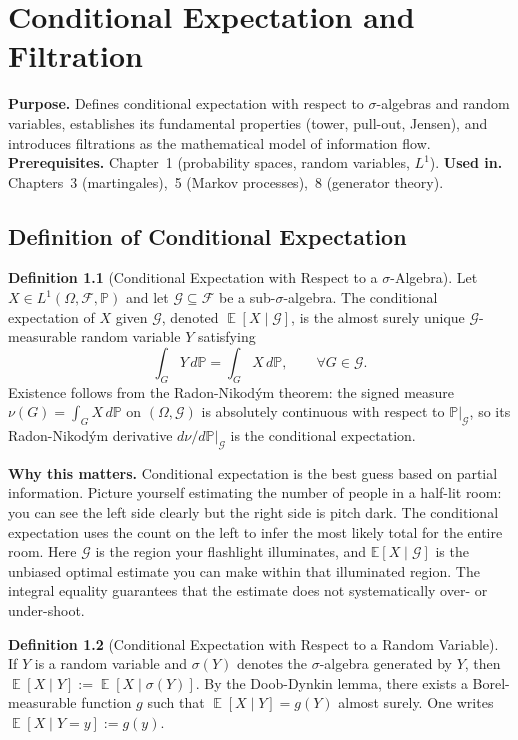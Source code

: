 \documentclass[11pt,a4paper,openany]{book}
\theoremstyle{definition}
\newtheorem{definition}{Definition}[chapter]
\theoremstyle{plain}
\theoremstyle{remark}
\DeclareMathOperator{\E}{\mathbb{E}}
\newcommand{\1}{\mathbbm{1}}
\newcommand{\F}{\mathcal{F}}
\newcommand{\Pbb}{\mathbb{P}}
\newcommand{\calG}{\mathcal{G}}
\begin{document}
\chapter{Conditional Expectation and Filtration}

\noindent\textbf{Purpose.} Defines conditional expectation with respect to $\sigma$-algebras and random variables, establishes its fundamental properties (tower, pull-out, Jensen), and introduces filtrations as the mathematical model of information flow.
\textbf{Prerequisites.} Chapter~1 (probability spaces, random variables, $L^{1}$).
\textbf{Used in.} Chapters~3 (martingales),~5 (Markov processes),~8 (generator theory).

\section{Definition of Conditional Expectation}

\begin{definition}[Conditional Expectation with Respect to a $\sigma$-Algebra]
Let $X \in L^{1}(\Omega, \F, \Pbb)$ and let $\calG \subseteq \F$ be a sub-$\sigma$-algebra. The conditional expectation of $X$ given $\calG$, denoted $\E[X \mid \calG]$, is the almost surely unique $\calG$-measurable random variable $Y$ satisfying
\[
\int_{G} Y \, d\Pbb = \int_{G} X \, d\Pbb, \qquad \forall G \in \calG.
\]
Existence follows from the Radon-Nikod\'{y}m theorem: the signed measure $\nu(G) = \int_{G} X \, d\Pbb$ on $(\Omega, \calG)$ is absolutely continuous with respect to $\Pbb|_{\calG}$, so its Radon-Nikod\'{y}m derivative $d\nu/d\Pbb|_{\calG}$ is the conditional expectation.
\end{definition}

\medskip
\noindent\textbf{Why this matters.} Conditional expectation is the best guess based on partial information. Picture yourself estimating the number of people in a half-lit room: you can see the left side clearly but the right side is pitch dark. The conditional expectation uses the count on the left to infer the most likely total for the entire room. Here $\mathcal{G}$ is the region your flashlight illuminates, and $\mathbb{E}[X \mid \mathcal{G}]$ is the unbiased optimal estimate you can make within that illuminated region. The integral equality guarantees that the estimate does not systematically over- or under-shoot.

\begin{definition}[Conditional Expectation with Respect to a Random Variable]
If $Y$ is a random variable and $\sigma(Y)$ denotes the $\sigma$-algebra generated by $Y$, then $\E[X \mid Y] := \E[X \mid \sigma(Y)]$. By the Doob-Dynkin lemma, there exists a Borel-measurable function $g$ such that $\E[X \mid Y] = g(Y)$ almost surely. One writes $\E[X \mid Y = y] := g(y)$.
\end{definition}
\end{document}
